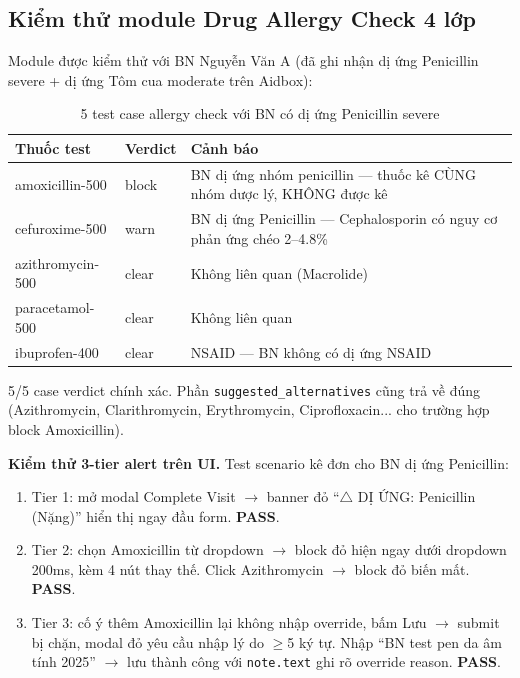 \documentclass[a4paper,13pt,3p,twoside,openany]{report}
\theoremstyle{definition}
\theoremstyle{remark}
\theoremstyle{definition}
\let\ORIGsubsection\subsection
\renewcommand{\subsection}{\needspace{3\baselineskip}\ORIGsubsection}
\begin{document}
\subsection{Kiểm thử module Drug Allergy Check 4 lớp}

Module được kiểm thử với BN Nguyễn Văn A (đã ghi nhận dị ứng Penicillin severe + dị ứng Tôm cua moderate trên Aidbox):

\begin{table}[H]
\centering
\begin{tabular}{|p{3.5cm}|p{2cm}|p{8cm}|}
\hline
\textbf{Thuốc test} & \textbf{Verdict} & \textbf{Cảnh báo} \\
\hline
amoxicillin-500 & block & BN dị ứng nhóm penicillin --- thuốc kê CÙNG nhóm dược lý, KHÔNG được kê \\
\hline
cefuroxime-500 & warn & BN dị ứng Penicillin --- Cephalosporin có nguy cơ phản ứng chéo 2--4.8\% \\
\hline
azithromycin-500 & clear & Không liên quan (Macrolide) \\
\hline
paracetamol-500 & clear & Không liên quan \\
\hline
ibuprofen-400 & clear & NSAID --- BN không có dị ứng NSAID \\
\hline
\end{tabular}
\caption{5 test case allergy check với BN có dị ứng Penicillin severe}
\label{tab:allergy-test}
\end{table}

5/5 case verdict chính xác. Phần \texttt{suggested\_alternatives} cũng trả về đúng (Azithromycin, Clarithromycin, Erythromycin, Ciprofloxacin... cho trường hợp block Amoxicillin).

\textbf{Kiểm thử 3-tier alert trên UI.} Test scenario kê đơn cho BN dị ứng Penicillin:
\begin{enumerate}
  \item Tier 1: mở modal Complete Visit $\to$ banner đỏ ``$\triangle$ DỊ ỨNG: Penicillin (Nặng)'' hiển thị ngay đầu form. \textbf{PASS}.
  \item Tier 2: chọn Amoxicillin từ dropdown $\to$ block đỏ hiện ngay dưới dropdown 200ms, kèm 4 nút thay thế. Click Azithromycin $\to$ block đỏ biến mất. \textbf{PASS}.
  \item Tier 3: cố ý thêm Amoxicillin lại không nhập override, bấm Lưu $\to$ submit bị chặn, modal đỏ yêu cầu nhập lý do $\geq$5 ký tự. Nhập ``BN test pen da âm tính 2025'' $\to$ lưu thành công với \texttt{note.text} ghi rõ override reason. \textbf{PASS}.
\end{enumerate}
\end{document}
